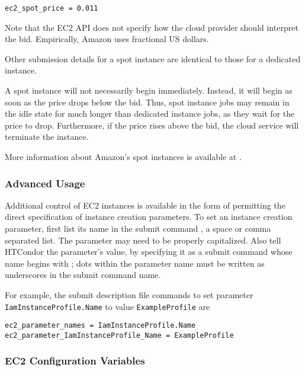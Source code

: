 \begin{verbatim}
ec2_spot_price = 0.011
\end{verbatim}

Note that the EC2 API does not specify how the cloud provider 
should interpret the bid.
Empirically, Amazon uses fractional US dollars.

Other submission details for a spot instance are identical to those
for a dedicated instance.

A spot instance will not necessarily begin immediately.
Instead, 
it will begin as soon as the price drops below the bid.
Thus, spot instance jobs
may remain in the idle state for much longer than dedicated instance jobs,
as they wait for the price to drop.
Furthermore, if the price rises above the bid, 
the cloud service will terminate the instance.

More information about Amazon's spot instances is available at
.

\subsubsection{\label{sec:Amazon-parameters}Advanced Usage}

Additional control of EC2 instances is available in the form
of permitting the
direct specification of instance creation parameters.  
To set an instance creation parameter, 
first list its name in the submit command ,
a space or comma separated list.  
The parameter may need to be properly capitalized.  
Also tell HTCondor the parameter's value, 
by specifying it as a submit command whose name begins with
; dots within the parameter name must be
written as underscores in the submit command name.

For example, the submit description file commands
to set parameter \texttt{IamInstanceProfile.Name} 
to value \texttt{ExampleProfile} are

\begin{verbatim}
ec2_parameter_names = IamInstanceProfile.Name
ec2_parameter_IamInstanceProfile_Name = ExampleProfile
\end{verbatim}

\subsubsection{\label{sec:Amazon-config}EC2 Configuration Variables}


